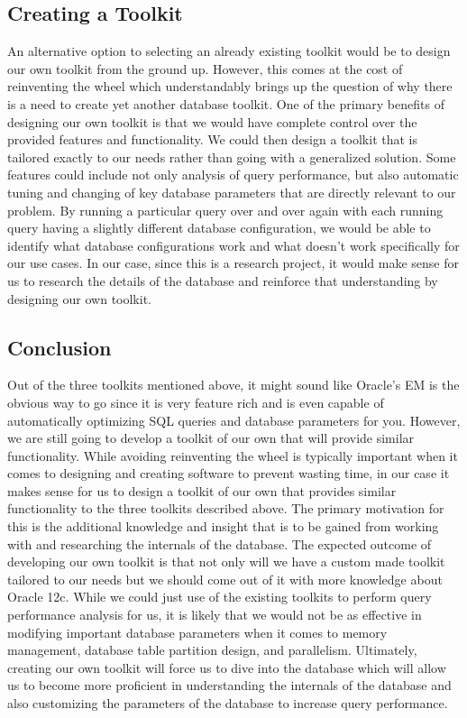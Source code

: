 \documentclass[draftclsnofoot, onecolumn, compsoc, 10pt]{IEEEtran}
\begin{document}
\subsection{Creating a Toolkit}
An alternative option to selecting an already existing toolkit would be to design our own toolkit from the ground up. 
However, this comes at the cost of reinventing the wheel which understandably brings up the question of why there is a need to create yet another database toolkit.
One of the primary benefits of designing our own toolkit is that we would have complete control over the provided features and functionality.
We could then design a toolkit that is tailored exactly to our needs rather than going with a generalized solution.
Some features could include not only analysis of query performance, but also automatic tuning and changing of key database parameters that are directly relevant to our problem.
By running a particular query over and over again with each running query having a slightly different database configuration, we would be able to identify what database configurations work and what doesn't work specifically for our use cases.
In our case, since this is a research project, it would make sense for us to research the details of the database and reinforce that understanding by designing our own toolkit.

\subsection{Conclusion}
Out of the three toolkits mentioned above, it might sound like Oracle’s EM is the obvious way to go since it is very feature rich and is even capable of automatically optimizing SQL queries and database parameters for you. 
However, we are still going to develop a toolkit of our own that will provide similar functionality. 
While avoiding reinventing the wheel is typically important when it comes to designing and creating software to prevent wasting time, in our case it makes sense for us to design a toolkit of our own that provides similar functionality to the three toolkits described above. 
The primary motivation for this is the additional knowledge and insight that is to be gained from working with and researching the internals of the database.
The expected outcome of developing our own toolkit is that not only will we have a custom made toolkit tailored to our needs but we should come out of it with more knowledge about Oracle 12c. 
While we could just use of the existing toolkits to perform query performance analysis for us, it is likely that we would not be as effective in modifying important database parameters when it comes to memory management, database table partition design, and parallelism. 
Ultimately, creating our own toolkit will force us to dive into the database which will allow us to become more proficient in understanding the internals of the database and also customizing the parameters of the database to increase query performance.
\end{document}
